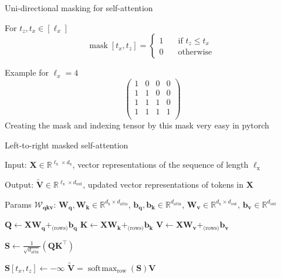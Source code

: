 \documentclass[12pt,aspectratio=169,handout]{beamer}
\DeclareMathOperator*{\softmax}{soft\!\max}
\DeclareMathOperator*{\mask}{mask}
\begin{document}
\begin{frame}{Uni-directional masking for self-attention}

For $t_z, t_x \in [\ell_x]$
$$
\mask[t_x, t_z] =
 \begin{cases}
	1       & \quad \text{if } t_z \leq t_x \\
	0  & \quad \text{otherwise }
\end{cases}
$$


Example for $\ell_x = 4$
$$
\begin{pmatrix}
1 & 0 & 0 & 0 \\
1 & 1 & 0 & 0 \\
1 & 1 & 1 & 0 \\
1 & 1 & 1 & 1 \\
\end{pmatrix}
$$
Creating the mask and indexing tensor by this mask very easy in pytorch
\end{frame}


\begin{frame}{Left-to-right masked self-attention}
	
	\begin{minipage}[t][10cm][t]{15cm}
		
		Input: $\bm{X} \in \mathbb{R}^{\ell_{\text{x}} \times d_{\text{x}}}$, vector representations of the sequence of length $\ell_{\text{x}}$
		
		Output: $\bm{\tilde{V}} \in \mathbb{R}^{\ell_{\text{x}} \times d_{\text{out}}}$, updated vector representations of tokens in $\bm{X}$
		
		Params $\bm{\mathcal{W}_{qkv}}$: $\bm{W_q}, \bm{W_k} \in \mathbb{R}^{d_\text{x} \times d_\text{attn}}$, $\bm{b_q}, \bm{b_k} \in \mathbb{R}^{d_\text{attn}}$, $\bm{W_v} \in \mathbb{R}^{d_\text{x} \times d_\text{out}}$, $ \bm{b_v} \in \mathbb{R}^{d_\text{out}}$
		
		\begin{algorithmic}[1]
			\State $\bm{Q} \gets \bm{X} \bm{W_q} +_{\text{(rows)}} \bm{b_q}$
			\State $\bm{K} \gets \bm{X} \bm{W_k} +_{\text{(rows)}} \bm{b_k}$
			\State $\bm{V} \gets \bm{X} \bm{W_v} +_{\text{(rows)}} \bm{b_v}$
			
			\State $\bm{S} \gets \frac{1}{\sqrt{d_{\text{attn}}}} (\bm{Q} \bm{K}^\top)$

			\If{$\neg \mask[t_x, t_z]$}
				 $\bm{S}[t_x, t_z] \gets - \infty$
			\EndIf
			\EndFor
			\State \Return $\bm{\tilde V} = \softmax_{\text{row}}(\bm{S}) \bm{V}$
			
			\EndFunction
		\end{algorithmic}
		
	\end{minipage}
\end{frame}
\end{document}
